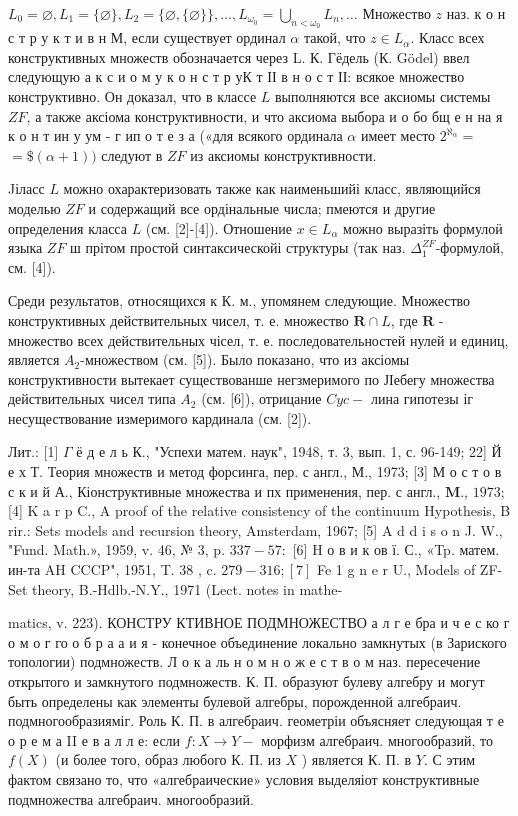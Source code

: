 \documentclass[10pt]{article}
\begin{document}
$L_{0}=\varnothing, L_{1}=\{\varnothing\}, L_{2}=\{\varnothing,\{\varnothing\}\}, \ldots, L_{\omega_{0}}=\bigcup_{n<\omega_{0}} L_{n}, \ldots$ Множество $z$ наз. к о н с т р у к т и в н М, если существует ординал $\alpha$ такой, что $z \in L_{\alpha}$. Класс всех конструктивных множеств обозначается через L. К. Гёдель (К. Gödel) ввел следующую а к с и о м у к о н с т р уК т ІІ в н о с т ІІ: всякое множество конструктивно. Он доказал, что в классе $L$ выполняются все аксиомы системы $Z F$, а также аксіома конструктивности, и что аксиома выбора и о бо бщ е н на я к о н т ин у ум - г ип о т е з а («для всякого ординала $\alpha$ имеет место $2^{\aleph_{\alpha}}=$ $=\$(\alpha+1))$ следуют в $Z F$ из аксиомы конструктивности.



Jіласс $L$ можно охарактеризовать также как наименьшийі класс, являющийся моделью $Z F$ и содержащий все ордінальные числа; пмеются и другие определения класса $L$ (см. [2]-[4]). Отношение $x \in L_{\alpha}$ можно выразіть формулоӥ языка $Z F$ ш прітом простой синтаксическойі структуры (так наз. $\Delta_{1}^{Z F}$-формулой, см. [4]).



Среди результатов, относящихся к К. м., упомянем следующие. Множество конструктивных действительных чисел, т. е. множество $\boldsymbol{R} \cap L$, где $\boldsymbol{R}$ - множество всех действительных чісел, т. е. последовательностей нулей и единиц, является $A_{2}$-множеством (см. [5]). Было показано, что из аксіомы конструктивности вытекает существованше негзмеримого по ЈІебегу множества действительных чисел типа $A_{2}$ (см. [6]), отрицание $C y c-$ лина гипотезы іг несуществование измеримого кардинала (см. [2]).



Лит.: [1] $\Gamma$ ё д е л ь К., "Успехи матем. наук", 1948, т. 3, вып. 1, с. 96-149; 22] Й е х Т. Теория множеств и метод форсинга, пер. с англ., М., 1973; [3] М о с т о в с к и й А., Кіонструктивные множества и пх применения, пер. с англ., $\mathbf{M}$., $1973 ;$ [4] K a r p C., A proof of the relative consistency of the continuum Hypothesis, B rir.: Sets models and recursion theory, Amsterdam, 1967; [5] A d d i s o n J. W., "Fund. Math.», 1959, v. 46, № 3, p. $337-57:$ [6] H о в и к ов ї. С., «Tp. матем. ин-та AH CCCP", 1951, T. 38 , c. $279-316 ;[7]$ Fe 1 g n e r U., Models of ZF-Set theory, B.-Hdlb.-N.Y., 1971 (Lect. notes in mathe-

matics, v. 223). КОНСТРУ КТИВНОЕ ПОДМНОЖЕСТВО а л г е бра и ч е с ко г о м о г го о б р а $а$ и я - конечное объединение локально замкнутых (в Зариского топологии) подмножеств. Л о к а ль н о м н о ж е с т в о м наз. пересечение открытого и замкнутого подмножеств. К. П. образуют булеву алгебру и могут быть определены как элементы булевой алгебры, порожденной алгебраич. подмногообразияміг. Роль К. П. в алгебраич. геометріи объясняет следующая т е о р е м а II е в а л л е: если $f: X \rightarrow Y-$ морфизм алгебраич. многообразий, то $f(X)$ (и более того, образ любого К. П. из $X$ ) является К. П. в $Y$. С этим фактом связано то, что «алгебраические» условия выделяіот конструктивные подмножества алгебраич. многообразий.
\end{document}
